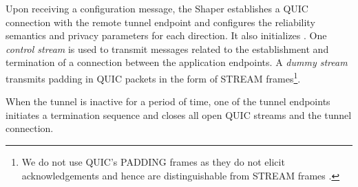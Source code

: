 Upon receiving a configuration message, the Shaper establishes a QUIC
connection with the remote tunnel endpoint and configures the reliability
semantics and privacy parameters
for each direction.
It also initializes .
One {\em control stream} is used to transmit
messages related to the establishment and termination of a connection
between the application endpoints. A {\em dummy stream} transmits padding
in QUIC packets in the form of STREAM frames\footnote{We do not use QUIC's
PADDING frames as they do not elicit acknowledgements and hence are
distinguishable from STREAM frames \cite{rfc9000}.}.

{When the tunnel is inactive for a period of time, one of the tunnel
endpoints initiates a termination sequence and closes all open QUIC streams and
the tunnel connection.}


